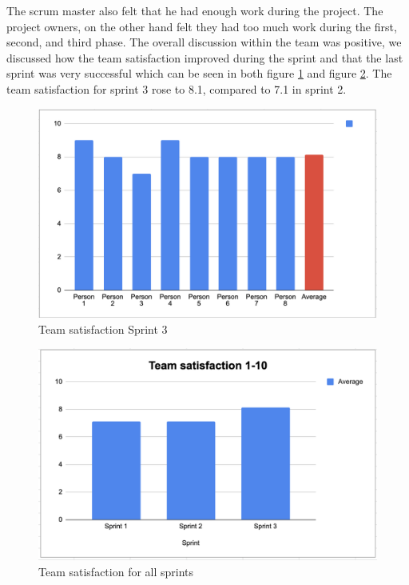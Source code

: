 \documentclass{article}
\begin{document}
The scrum master also felt that he had enough work during the project. The project owners, on the other hand felt they had too much work during the first, second, and third phase. The overall discussion within the team was positive, we discussed how the team satisfaction improved during the sprint and that the last sprint was very successful which can be seen in both figure \ref{fig:satisfaction3} and figure \ref{fig:totalSatisfaction}. The team satisfaction for sprint 3 rose to 8.1, compared to 7.1 in sprint 2. 

\begin{figure}[H]
    \centering
    \includegraphics[scale=0.6]{pfrFigures/TeamSatisfactionSprint3.png}
    \caption{Team satisfaction Sprint 3}
    \label{fig:satisfaction3}
\end{figure}

\begin{figure}[H]
    \centering
    \includegraphics[scale=0.6]{pfrFigures/ToptalSatisfaction.png}
    \caption{Team satisfaction for all sprints}
    \label{fig:totalSatisfaction}
\end{figure}
\end{document}
